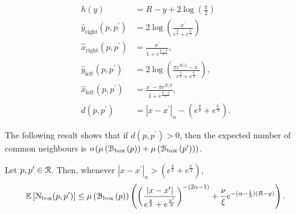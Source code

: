 \begin{align}
	h(y) &= R - y + 2\log\left(\frac{\pi}{2}\right) \label{eq:def_height_y_P_n}\\
	\hat{y}_{\text{right}}(p,p^\prime) &= 2\log\left(\frac{x^\prime}{e^{\frac{y}{2}} + e^{\frac{y^\prime}{2}}}\right)\\
	\hat{x}_{\text{right}}(p,p^\prime) &= \frac{x^\prime}{1 + 	
		e^{\frac{y^\prime - y}{2}}},\\
	\hat{y}_{\text{left}}(p,p^\prime) &= 2 \log\left(\frac{\pi e^{R/2} - x^\prime}{e^{\frac{y}{2}} + e^{\frac{y^\prime}{2}}}\right),\\
	\hat{x}_{\text{left}}(p,p^\prime) &= \frac{x^\prime - \pi e^{R/2}}{1 + e^{\frac{y^\prime - y}{2}}}, \\
	d(p,p^\prime) &= |x - x^\prime|_n - \left(e^{\frac{y}{2}} + e^{\frac{y^\prime}{2}}\right).
	\label{eq:def_d_p_p_prime}
\end{align}

The following result shows that if $d(p,p^\prime) > 0$, then the expected number of common neighbours is $o\left(\mu\left({\mathcal B}_{\text{box}}\left(p\right)\right) + \mu\left({\mathcal B}_{\text{box}}\left(p^\prime\right)\right)\right)$.

\begin{lemma}\label{lem:common_neighbours_Pcal_n}
Let $p, p^\prime \in {\mathcal R}$. Then, whenever $|x - x^\prime|_n > \left(e^{\frac{y}{2}} + e^{\frac{y^\prime}{2}}\right)$,
\[
	\mathbb{E}\left[{\mathcal N}_{\text{box}}(p,p^\prime)\right] \le \mu\left({\mathcal B}_{\text{box}}\left(p\right)\right)
	\left(\left(\frac{|x - x^\prime|}{e^{\frac{y}{2}} + e^{\frac{y^\prime}{2}}}\right)^{-(2\alpha - 1)}  
	+ \frac{\nu}{\xi} e^{-(\alpha - \frac{1}{2})(R-y)}\right).
\]
\end{lemma}

